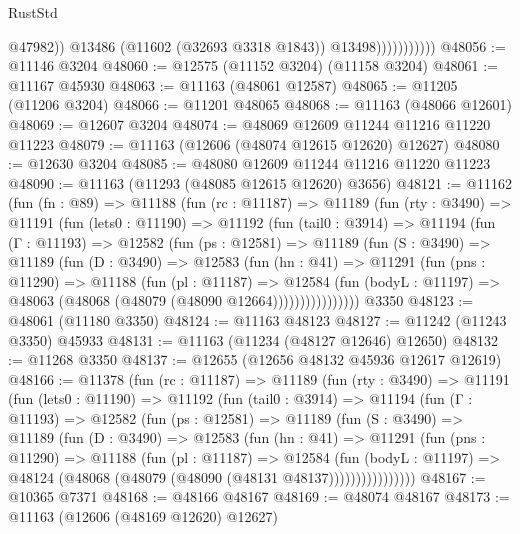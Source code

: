 \begin{lexlean}{RustStd}
\begin{coremodule}
                              @47982))
                          @13486
                          (@11602 (@32693 @3318 @1843))
                          @13498)))))))))))
@48056 := @11146 @3204
@48060 := @12575 (@11152 @3204) (@11158 @3204)
@48061 := @11167 @45930
@48063 := @11163 (@48061 @12587)
@48065 := @11205 (@11206 @3204)
@48066 := @11201 @48065
@48068 := @11163 (@48066 @12601)
@48069 := @12607 @3204
@48074 := @48069 @12609 @11244 @11216 @11220 @11223
@48079 := @11163 (@12606 (@48074 @12615 @12620) @12627)
@48080 := @12630 @3204
@48085 := @48080 @12609 @11244 @11216 @11220 @11223
@48090 := @11163 (@11293 (@48085 @12615 @12620) @3656)
@48121 := @11162
    (fun (fn : @89) =>
    @11188
      (fun (rc : @11187) =>
      @11189
        (fun (rty : @3490) =>
        @11191
          (fun (lets0 : @11190) =>
          @11192
            (fun (tail0 : @3914) =>
            @11194
              (fun (Γ : @11193) =>
              @12582
                (fun (ps : @12581) =>
                @11189
                  (fun (S : @3490) =>
                  @11189
                    (fun (D : @3490) =>
                    @12583
                      (fun (hn : @41) =>
                      @11291
                        (fun (pns : @11290) =>
                        @11188
                          (fun (pl : @11187) =>
                          @12584
                            (fun (bodyL : @11197) =>
                            @48063 (@48068 (@48079 (@48090 @12664))))))))))))))))
    @3350
@48123 := @48061 (@11180 @3350)
@48124 := @11163 @48123
@48127 := @11242 (@11243 @3350) @45933
@48131 := @11163 (@11234 (@48127 @12646) @12650)
@48132 := @11268 @3350
@48137 := @12655 (@12656 @48132 @45936 @12617 @12619)
@48166 := @11378
    (fun (rc : @11187) =>
    @11189
      (fun (rty : @3490) =>
      @11191
        (fun (lets0 : @11190) =>
        @11192
          (fun (tail0 : @3914) =>
          @11194
            (fun (Γ : @11193) =>
            @12582
              (fun (ps : @12581) =>
              @11189
                (fun (S : @3490) =>
                @11189
                  (fun (D : @3490) =>
                  @12583
                    (fun (hn : @41) =>
                    @11291
                      (fun (pns : @11290) =>
                      @11188
                        (fun (pl : @11187) =>
                        @12584
                          (fun (bodyL : @11197) =>
                          @48124 (@48068 (@48079 (@48090 (@48131 @48137))))))))))))))))
@48167 := @10365 @7371
@48168 := @48166 @48167
@48169 := @48074 @48167
@48173 := @11163 (@12606 (@48169 @12620) @12627)

\end{coremodule}
\end{lexlean}
